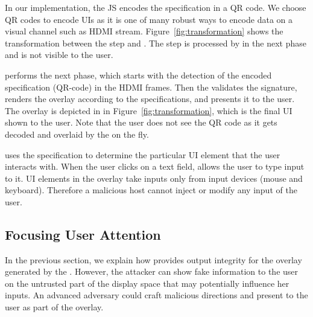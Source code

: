 In our implementation, the \name JS encodes the specification in a QR code. We choose QR codes to encode UIs as it is one of many robust ways to encode data on a visual channel such as HDMI stream. Figure~\ref{fig:transformation} shows the transformation between the step \one and \two. The step \two is processed by \device in the next phase and is not visible to the user.




 \device performs the next phase, which starts with the detection of the encoded specification (QR-code) in the HDMI frames. Then the \device validates the signature, renders the overlay according to the specifications, and presents it to the user.  The \device overlay is depicted in \three in Figure~\ref{fig:transformation}, which is the final UI shown to the user. Note that the user does not see the QR code as it gets decoded and overlaid by the \device on the fly.

\device uses the specification to determine the particular UI element that the user interacts with. When the user clicks on a text field, \device allows the user to type input to it. UI elements in the overlay take inputs only from input devices (mouse and keyboard). Therefore a malicious host cannot inject or modify any input of the user.

\subsection{Focusing User Attention}
\label{sec:systemDesign:userAttention}

In the previous section, we explain how \name provides output integrity for the overlay generated by the \device. However, the attacker can show fake information to the user on the untrusted part of the display space that may potentially influence her inputs. An advanced adversary could craft malicious directions and present to the user as part of the overlay.

